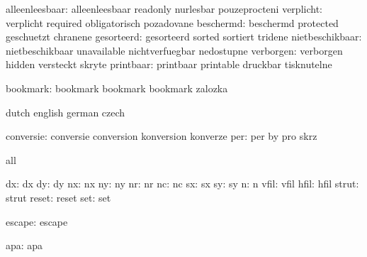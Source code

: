      alleenleesbaar:  alleenleesbaar       readonly            nurlesbar
                      pouzeprocteni
          verplicht:  verplicht            required            obligatorisch
                      pozadovane
          beschermd:  beschermd            protected           geschuetzt
                      chranene
         gesorteerd:  gesorteerd           sorted              sortiert
                      tridene
    nietbeschikbaar:  nietbeschikbaar      unavailable         nichtverfuegbar
                      nedostupne
          verborgen:  verborgen            hidden              versteckt
                      skryte
          printbaar:  printbaar            printable           druckbar
                      tisknutelne

           bookmark:  bookmark             bookmark            bookmark
                      zalozka 
 
\stopvariables




\startvariables       dutch                english             german
                      czech

          conversie:  conversie            conversion          konversion
                      konverze
                per:  per                  by                  pro
                      skrz

\stopvariables




\startconstants       all

                 dx:  dx
                 dy:  dy
                 nx:  nx
                 ny:  ny
                 nr:  nr 
                 nc:  nc 
                 sx:  sx
                 sy:  sy
                  n:  n
               vfil:  vfil
               hfil:  hfil
              strut:  strut
              reset:  reset
                set:  set

             escape:  escape

                apa:  apa

\stopconstants

